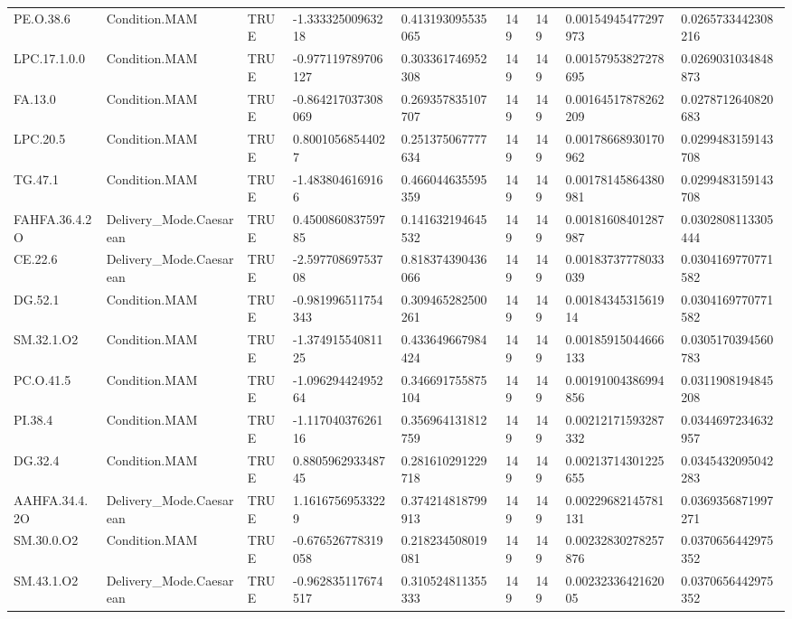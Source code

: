 \begin{longtable}{lllllllll}
PE.O.38.6 & Condition.MAM & TRUE & -1.33332500963218 & 0.413193095535065 & 149 & 149 & 0.00154945477297973 & 0.0265733442308216 \\
LPC.17.1.0.0 & Condition.MAM & TRUE & -0.977119789706127 & 0.303361746952308 & 149 & 149 & 0.00157953827278695 & 0.0269031034848873 \\
FA.13.0 & Condition.MAM & TRUE & -0.864217037308069 & 0.269357835107707 & 149 & 149 & 0.00164517878262209 & 0.0278712640820683 \\
LPC.20.5 & Condition.MAM & TRUE & 0.80010568544027 & 0.251375067777634 & 149 & 149 & 0.00178668930170962 & 0.0299483159143708 \\
TG.47.1 & Condition.MAM & TRUE & -1.4838046169166 & 0.466044635595359 & 149 & 149 & 0.00178145864380981 & 0.0299483159143708 \\
FAHFA.36.4.2O & Delivery\_Mode.Caesarean & TRUE & 0.450086083759785 & 0.141632194645532 & 149 & 149 & 0.00181608401287987 & 0.0302808113305444 \\
CE.22.6 & Delivery\_Mode.Caesarean & TRUE & -2.59770869753708 & 0.818374390436066 & 149 & 149 & 0.00183737778033039 & 0.0304169770771582 \\
DG.52.1 & Condition.MAM & TRUE & -0.981996511754343 & 0.309465282500261 & 149 & 149 & 0.0018434531561914 & 0.0304169770771582 \\
SM.32.1.O2 & Condition.MAM & TRUE & -1.37491554081125 & 0.433649667984424 & 149 & 149 & 0.00185915044666133 & 0.0305170394560783 \\
PC.O.41.5 & Condition.MAM & TRUE & -1.09629442495264 & 0.346691755875104 & 149 & 149 & 0.00191004386994856 & 0.0311908194845208 \\
PI.38.4 & Condition.MAM & TRUE & -1.11704037626116 & 0.356964131812759 & 149 & 149 & 0.00212171593287332 & 0.0344697234632957 \\
DG.32.4 & Condition.MAM & TRUE & 0.880596293348745 & 0.281610291229718 & 149 & 149 & 0.00213714301225655 & 0.0345432095042283 \\
AAHFA.34.4.2O & Delivery\_Mode.Caesarean & TRUE & 1.16167569533229 & 0.374214818799913 & 149 & 149 & 0.00229682145781131 & 0.0369356871997271 \\
SM.30.0.O2 & Condition.MAM & TRUE & -0.676526778319058 & 0.218234508019081 & 149 & 149 & 0.00232830278257876 & 0.0370656442975352 \\
SM.43.1.O2 & Delivery\_Mode.Caesarean & TRUE & -0.962835117674517 & 0.310524811355333 & 149 & 149 & 0.0023233642162005 & 0.0370656442975352 \\

\end{longtable}
